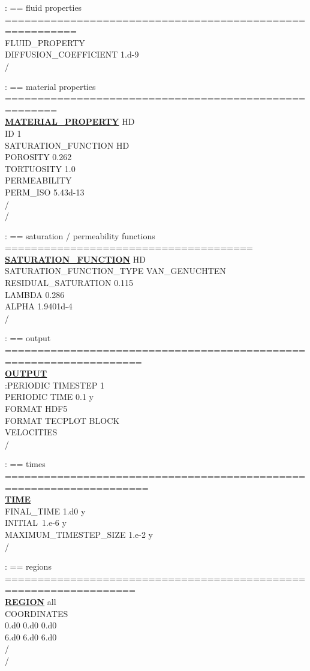 \documentclass[12pt]{article}
\begin{document}
\noindent
: == fluid properties =========================================================\\
FLUID\_PROPERTY\\
DIFFUSION\_COEFFICIENT 1.d-9\\
/

\noindent
: == material properties ======================================================\\
\hyperlink{target_mat}{\bf MATERIAL\_PROPERTY} HD\\
ID 1\\
SATURATION\_FUNCTION HD\\
POROSITY 0.262\\
TORTUOSITY 1.0\\
PERMEABILITY\\
PERM\_ISO 5.43d-13\\
/\\
/

\noindent
: == saturation / permeability functions ======================================\\
\hyperlink{target_sat}{\bf SATURATION\_FUNCTION} HD\\
SATURATION\_FUNCTION\_TYPE VAN\_GENUCHTEN\\
RESIDUAL\_SATURATION 0.115\\
LAMBDA 0.286\\
ALPHA 1.9401d-4\\
/

\noindent
: == output ===================================================================\\
\hyperlink{target_output}{\bf OUTPUT}\\
:PERIODIC TIMESTEP 1\\
PERIODIC TIME 0.1 y\\
FORMAT HDF5\\
FORMAT TECPLOT BLOCK\\
VELOCITIES\\
/

\noindent
: == times ====================================================================\\
\hyperlink{target_time}{\bf TIME}\\
FINAL\_TIME 1.d0 y\\
INITIAL\ 1.e-6 y\\
MAXIMUM\_TIMESTEP\_SIZE 1.e-2 y\\
/

\noindent
: == regions ==================================================================\\
\hyperlink{target_region}{\bf REGION} all\\
COORDINATES\\
0.d0 0.d0 0.d0\\
6.d0 6.d0 6.d0\\
/\\
/
\end{document}
